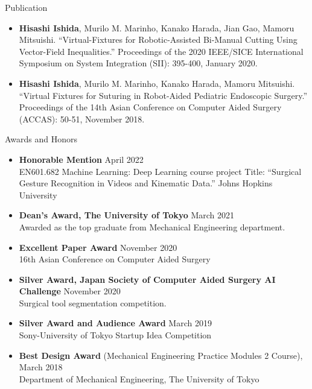 \documentclass{resume} %
\begin{document}
\begin{rSection}{Publication}
\begin{itemize}
\item \textbf{Hisashi Ishida}, Murilo M. Marinho, Kanako Harada, Jian Gao, Mamoru Mitsuishi. “Virtual-Fixtures for Robotic-Assisted Bi-Manual Cutting Using Vector-Field Inequalities.” Proceedings of the 2020 IEEE/SICE International Symposium on System Integration (SII): 395-400, January 2020.

\item \textbf{Hisashi Ishida}, Murilo M. Marinho, Kanako Harada, Mamoru Mitsuishi. “Virtual Fixtures for Suturing in Robot-Aided Pediatric Endoscopic Surgery.” Proceedings of the 14th Asian Conference on Computer Aided Surgery (ACCAS): 50-51, November 2018.

\end{itemize}
\end{rSection}

\begin{rSection}{Awards and Honors}
\begin{itemize}
    \item \textbf{Honorable Mention} \hfill April 2022\\
    EN601.682 Machine Learning: Deep Learning course project
    Title: “Surgical Gesture Recognition in Videos and Kinematic Data.” Johns Hopkins University

    \item \textbf{Dean’s Award, The University of Tokyo} \hfill March 2021\\
    Awarded as the top graduate from Mechanical Engineering department.

    \item \textbf{Excellent Paper Award} \hfill November 2020\\
    16th Asian Conference on Computer Aided Surgery

    \item \textbf{Silver Award, Japan Society of Computer Aided Surgery AI Challenge} \hfill November 2020\\
    Surgical tool segmentation competition. 

    \item \textbf{Silver Award and Audience Award} \hfill March 2019\\
    Sony-University of Tokyo Startup Idea Competition

    \item \textbf{Best Design Award} (Mechanical Engineering Practice Modules 2 Course), \hfill March 2018\\
    Department of Mechanical Engineering, The University of Tokyo
    
\end{itemize}
\end{rSection}
\end{document}
